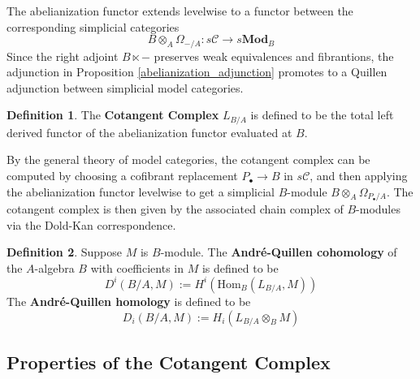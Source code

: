 \documentclass{article}
\newcommand{\Hom}{\textrm{Hom}}
\theoremstyle{definition}
\theoremstyle{definition}
\newtheorem{definition}{Definition}[theorem]
\theoremstyle{definition}
\theoremstyle{definition}
\theoremstyle{definition}
\theoremstyle{definition}
\theoremstyle{definition}
\begin{document}
The abelianization functor extends levelwise to a functor between the corresponding simplicial categories
	\[B\otimes_A \Omega_{-/A}: s\mathcal{C}\to s\textbf{Mod}_B\]
Since the right adjoint $B\ltimes -$ preserves weak equivalences and fibrantions, the adjunction in Proposition \ref{abelianization_adjunction} promotes to a Quillen adjunction between simplicial model categories.

\begin{definition}
	The \textbf{Cotangent Complex} $L_{B/A}$ is defined to be the total left derived functor of the abelianization functor evaluated at $B$. 
\end{definition}
By the general theory of model categories, the cotangent complex can be computed by choosing a cofibrant replacement $P_{\bullet}\to B$ in $s\mathcal{C}$, and then applying the abelianization functor levelwise to get a simplicial $B$-module $B\otimes_A \Omega_{P_{\bullet}/A}$. The cotangent complex is then given by the associated chain complex of $B$-modules via the Dold-Kan correspondence.

\begin{definition}
	Suppose $M$ is $B$-module. The \textbf{Andr\'e-Quillen cohomology} of the $A$-algebra $B$ with coefficients in $M$ is defined to be
	\[D^i(B/A,M):= H^i(\Hom_B (L_{B/A}, M))\]
	The \textbf{Andr\'e-Quillen homology} is defined to be
	\[D_i(B/A,M):= H_i(L_{B/A}\otimes_B M)\]
\end{definition}
















\subsection{Properties of the Cotangent Complex}
\end{document}
